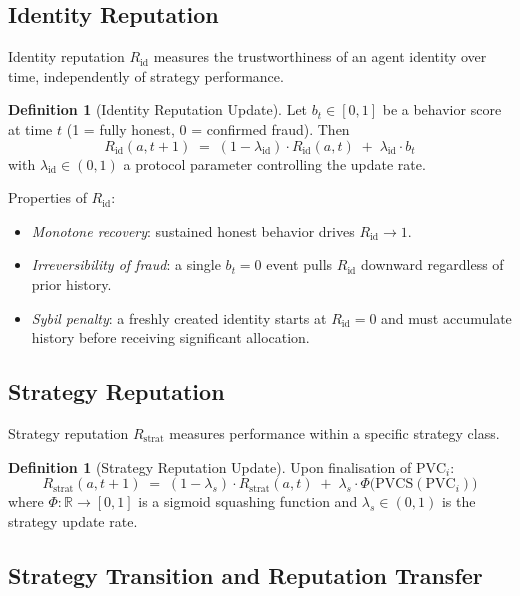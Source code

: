 \documentclass[11pt,a4paper]{article}
\theoremstyle{plain}
\theoremstyle{definition}
\newtheorem{definition}[theorem]{Definition}
\theoremstyle{remark}
\newcommand{\PVC}{\mathrm{PVC}}
\newcommand{\PVCS}{\mathrm{PVCS}}
\newcommand{\Rid}{R_{\mathrm{id}}}
\newcommand{\Rstrat}{R_{\mathrm{strat}}}
\newcommand{\R}{\mathbb{R}}
\begin{document}
\subsection{Identity Reputation}

Identity reputation $\Rid$ measures the trustworthiness of an agent identity
over time, independently of strategy performance.

\begin{definition}[Identity Reputation Update]
\label{def:rid}
Let $b_t \in [0,1]$ be a behavior score at time $t$ (1 = fully honest,
0 = confirmed fraud). Then
\[
  \Rid(a, t+1) \;=\; (1 - \lambda_{\mathrm{id}}) \cdot \Rid(a, t)
                    \;+\; \lambda_{\mathrm{id}} \cdot b_t
\]
with $\lambda_{\mathrm{id}} \in (0,1)$ a protocol parameter controlling the
update rate.
\end{definition}

Properties of $\Rid$:
\begin{itemize}
  \item \textit{Monotone recovery}: sustained honest behavior drives $\Rid \to 1$.
  \item \textit{Irreversibility of fraud}: a single $b_t = 0$ event pulls $\Rid$
        downward regardless of prior history.
  \item \textit{Sybil penalty}: a freshly created identity starts at $\Rid = 0$
        and must accumulate history before receiving significant allocation.
\end{itemize}

\subsection{Strategy Reputation}

Strategy reputation $\Rstrat$ measures performance within a specific strategy
class.

\begin{definition}[Strategy Reputation Update]
\label{def:rstrat}
Upon finalisation of $\PVC_i$:
\[
  \Rstrat(a, t+1) \;=\; (1 - \lambda_s) \cdot \Rstrat(a, t)
                       \;+\; \lambda_s \cdot \Phi\bigl(\PVCS(\PVC_i)\bigr)
\]
where $\Phi : \R \to [0,1]$ is a sigmoid squashing function and
$\lambda_s \in (0,1)$ is the strategy update rate.
\end{definition}

\subsection{Strategy Transition and Reputation Transfer}
\end{document}
